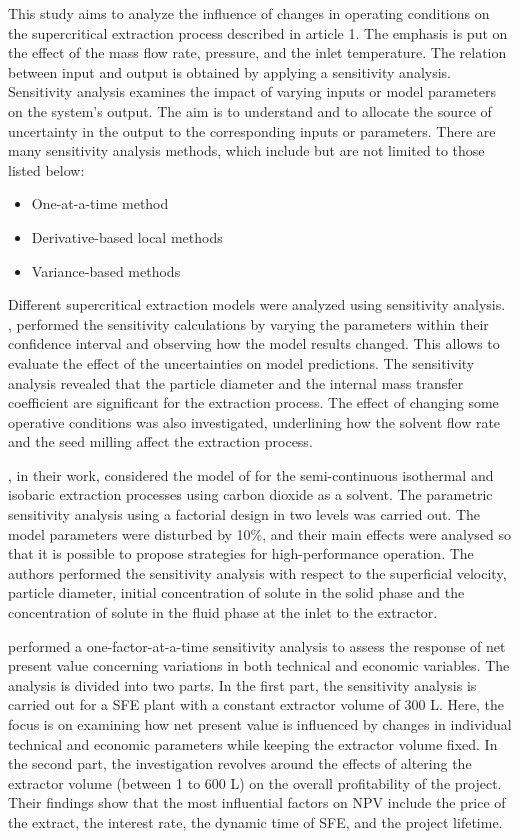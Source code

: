 \documentclass[../Article_Sensitivity_Analsysis.tex]{subfiles}
\begin{document}
	
	This study aims to analyze the influence of changes in operating conditions on the supercritical extraction process described in {\color{red}article 1}. The emphasis is put on the effect of the mass flow rate, pressure, and the inlet temperature. The relation between input and output is obtained by applying a sensitivity analysis. Sensitivity analysis examines the impact of varying inputs or model parameters on the system's output. The aim is to understand and to allocate the source of uncertainty in the output to the corresponding inputs or parameters. There are many sensitivity analysis methods, which include but are not limited to those listed below:
	
	\begin{itemize}
		\item One-at-a-time method
		\item Derivative-based local methods
		\item Variance-based methods
	\end{itemize}
	
	Different supercritical extraction models were analyzed using sensitivity analysis. \citet{Fiori_2007}, performed the sensitivity calculations by varying the parameters within their confidence interval and observing how the model results changed. This allows to evaluate the effect of the uncertainties on model predictions. The sensitivity analysis revealed that the particle diameter and the internal mass transfer coefficient are significant for the extraction process. The effect of changing some operative conditions was also investigated, underlining how the solvent flow rate and the seed milling affect the extraction process.
	
	\citet{Santos2000}, in their work, considered the model of \citet{Sovova1994} for the semi-continuous isothermal and isobaric extraction processes using carbon dioxide as a solvent. The parametric sensitivity analysis using a factorial design in two levels was carried out. The model parameters were disturbed by 10\%, and their main effects were analysed so that it is possible to propose strategies for high-performance operation. The authors performed the sensitivity analysis with respect to the superficial velocity, particle diameter, initial concentration of solute in the solid phase and the concentration of solute in the fluid phase at the inlet to the extractor.
	
	\citet{Hatami2024} performed a one-factor-at-a-time sensitivity analysis to	assess the response of net present value concerning variations in both technical and economic variables. The analysis is divided into two parts. In the first part, the sensitivity analysis is carried out for a SFE plant with a constant	extractor volume of 300 L. Here, the focus is on examining how net present value is influenced by changes in individual technical and economic parameters while keeping the extractor volume fixed. In the second part, the investigation revolves around the effects of altering the extractor volume (between 1 to 600 L) on the overall profitability of the project. Their findings show that the most influential factors on NPV include the price of the extract, the interest rate, the dynamic time of SFE, and the project lifetime.
	
\end{document}
